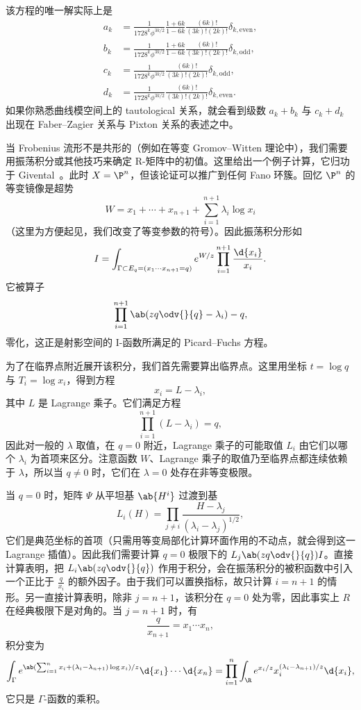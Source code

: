 该方程的唯一解实际上是
\begin{align*}
    a_k &= \frac{1}{1728^k \phi^{3k/2}} \frac{1+6k}{1-6k} \frac{(6k)!}{(3k)!(2k)!} \delta_{k, \text{even}},  \\
    b_k &= \frac{1}{1728^k \phi^{3k/2}} \frac{1+6k}{1-6k}\frac{(6k)!}{(3k)!(2k)!} \delta_{k, \text{odd}},  \\
    c_k &= \frac{1}{1728^k \phi^{3k/2}}\frac{(6k)!}{(3k)!(2k)!} \delta_{k, \text{odd}}, \\
    d_k &= \frac{1}{1728^k \phi^{3k/2}} \frac{(6k)!}{(3k)!(2k)!} \delta_{k, \text{even}}.
\end{align*}
如果你熟悉曲线模空间上的 tautological 关系，就会看到级数 \(a_k + b_k\) 与 \(c_k + d_k\) 出现在 Faber--Zagier 关系与 Pixton 关系的表述之中。

当 Frobenius 流形不是共形的（例如在等变 Gromov--Witten 理论中），我们需要用振荡积分或其他技巧来确定 R-矩阵中的初值。这里给出一个例子计算，它归功于 Givental~\cite{Givental2001semisimple}。此时 \(X = \P^n\)，但该论证可以推广到任何 Fano 环簇。回忆 \(\P^n\) 的等变镜像是超势
\[ W = x_1 + \cdots + x_{n+1} + \sum_{i=1}^{n+1} \lambda_i \log x_i \]
（这里为方便起见，我们改变了等变参数的符号）。因此振荡积分形如
\[ I = \int_{\Gamma \subset E_q = (x_1 \cdots x_{n+1}=q)} e^{W/z} \prod_{i=1}^{n+1} \frac{\d{x_i}}{x_i}. \]
它被算子
\[ \prod_{i=1}^{n+1}\ab(zq \odv{}{q} -\lambda_i) - q, \]
零化，这正是射影空间的 I-函数所满足的 Picard--Fuchs 方程。

为了在临界点附近展开该积分，我们首先需要算出临界点。这里用坐标 \(t = \log q\) 与 \(T_i = \log x_i\)，得到方程
\[ x_i = L - \lambda_i, \]
其中 \(L\) 是 Lagrange 乘子。它们满足方程
\[ \prod_{i=1}^{n+1} (L - \lambda_i) = q, \]
因此对一般的 \(\lambda\) 取值，在 \(q = 0\) 附近，Lagrange 乘子的可能取值 \(L_i\) 由它们以哪个 \(\lambda_i\) 为首项来区分。注意函数 \(W\)、Lagrange 乘子的取值乃至临界点都连续依赖于 \(\lambda\)，所以当 \(q \neq 0\) 时，它们在 \(\lambda = 0\) 处存在非等变极限。

当 \(q = 0\) 时，矩阵 \(\Psi\) 从平坦基 \(\ab{H^i}\) 过渡到基
\[ L_i(H) = \prod_{j \neq i} \frac{H - \lambda_j}{(\lambda_i - \lambda_j)^{1/2}}, \]
它们是典范坐标的首项（只需用等变局部化计算环面作用的不动点，就会得到这一 Lagrange 插值）。因此我们需要计算 \(q = 0\) 极限下的 \(L_j \ab(z q \odv{}{q}) I\)。直接计算表明，把 \(L_i \ab(z q \odv{}{q})\) 作用于积分，会在振荡积分的被积函数中引入一个正比于 \(\frac{q}{x_i}\) 的额外因子。由于我们可以置换指标，故只计算 \(i = n+1\) 的情形。另一直接计算表明，除非 \( j = n+1\)，该积分在 \(q = 0\) 处为零，因此事实上 \(R\) 在经典极限下是对角的。当 \(j = n+1\) 时，有
\[ \frac{q}{x_{n+1}} = x_1 \cdots x_n, \]
积分变为
\[ \int_{\Gamma} e^{\ab( \sum_{i=1}^n x_i + (\lambda_i - \lambda_{n+1})\log x_i ) / z} \d{x_1} \cdots \d{x_n} = \prod_{i=1}^n \int_{\R} e^{x_i/z} x_i^{(\lambda_i - \lambda_{n+1})/z} \d{x_i}, \]
它只是 \(\Gamma\)-函数的乘积。

